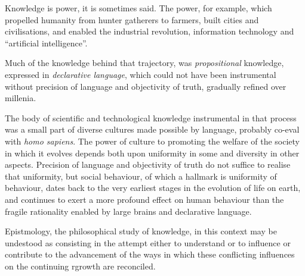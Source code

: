 Knowledge is power, it is sometimes said.
The power, for example, which propelled humanity from hunter gatherers to farmers, built cities and civilisations, and enabled the industrial revolution, information technology and ``artificial intelligence''.

Much of the knowledge behind that trajectory, was \emph{propositional} knowledge, expressed in \emph{declarative language}, which could not have been instrumental without precision of language and objectivity of truth, gradually refined over millenia.

The body of scientific and technological knowledge instrumental in that process was a small part of diverse cultures made possible by language, probably co-eval with \emph{homo sapiens}.
The power of culture to promoting the welfare of the society in which it evolves depends both upon uniformity in some and diversity in other aspects.
Precision of language and objectivity of truth do not suffice to realise that uniformity, but social behaviour, of which a hallmark is uniformity of behaviour, dates back to the very earliest stages in the evolution of life on earth, and continues to exert a more profound effect on human behaviour than the fragile rationality enabled by large brains and declarative language.

Epistmology, the philosophical study of knowledge, in this context may be undestood as consisting in the attempt either to understand or to influence or contribute to the advancement of the ways in which these conflicting influences on the continuing rgrowth are reconciled.

